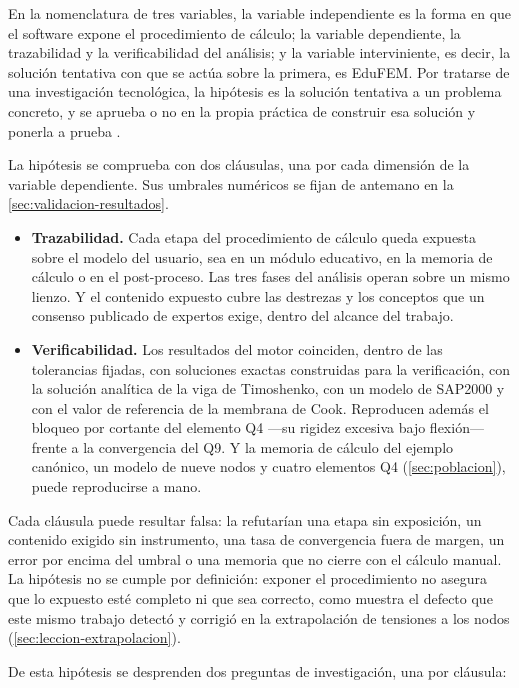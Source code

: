 En la nomenclatura de tres variables, la variable independiente es la forma en que el software expone el procedimiento de cálculo; la variable dependiente, la trazabilidad y la verificabilidad del análisis; y la variable interviniente, es decir, la solución tentativa con que se actúa sobre la primera, es EduFEM. Por tratarse de una investigación tecnológica, la hipótesis es la solución tentativa a un problema concreto, y se aprueba o no en la propia práctica de construir esa solución y ponerla a prueba \autocite[p.~85]{garciacordoba2005tecnologica}.

La hipótesis se comprueba con dos cláusulas, una por cada dimensión de la variable dependiente. Sus umbrales numéricos se fijan de antemano en la \autoref{sec:validacion-resultados}.

\begin{itemize}
    \item[(a)] \textbf{Trazabilidad.} Cada etapa del procedimiento de cálculo queda expuesta sobre el modelo del usuario, sea en un módulo educativo, en la memoria de cálculo o en el post-proceso. Las tres fases del análisis operan sobre un mismo lienzo. Y el contenido expuesto cubre las destrezas y los conceptos que un consenso publicado de expertos exige, dentro del alcance del trabajo.
    \item[(b)] \textbf{Verificabilidad.} Los resultados del motor coinciden, dentro de las tolerancias fijadas, con soluciones exactas construidas para la verificación, con la solución analítica de la viga de Timoshenko, con un modelo de SAP2000 y con el valor de referencia de la membrana de Cook. Reproducen además el bloqueo por cortante del elemento Q4 ---su rigidez excesiva bajo flexión--- frente a la convergencia del Q9. Y la memoria de cálculo del ejemplo canónico, un modelo de nueve nodos y cuatro elementos Q4 (\autoref{sec:poblacion}), puede reproducirse a mano.
\end{itemize}

Cada cláusula puede resultar falsa: la refutarían una etapa sin exposición, un contenido exigido sin instrumento, una tasa de convergencia fuera de margen, un error por encima del umbral o una memoria que no cierre con el cálculo manual. La hipótesis no se cumple por definición: exponer el procedimiento no asegura que lo expuesto esté completo ni que sea correcto, como muestra el defecto que este mismo trabajo detectó y corrigió en la extrapolación de tensiones a los nodos (\autoref{sec:leccion-extrapolacion}).

De esta hipótesis se desprenden dos preguntas de investigación, una por cláusula:

